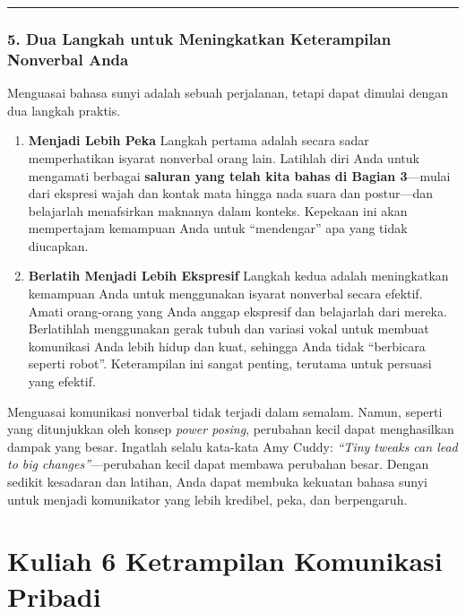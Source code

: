 \documentclass[
  letterpaper,
  DIV=11,
  numbers=noendperiod]{scrreprt}
\begin{document}
\begin{center}\rule{0.5\linewidth}{0.5pt}\end{center}

\subsection{5. Dua Langkah untuk Meningkatkan Keterampilan Nonverbal
Anda}\label{dua-langkah-untuk-meningkatkan-keterampilan-nonverbal-anda-1}

Menguasai bahasa sunyi adalah sebuah perjalanan, tetapi dapat dimulai
dengan dua langkah praktis.

\begin{enumerate}
\def\labelenumi{\arabic{enumi}.}
\item
  \textbf{Menjadi Lebih Peka} Langkah pertama adalah secara sadar
  memperhatikan isyarat nonverbal orang lain. Latihlah diri Anda untuk
  mengamati berbagai \textbf{saluran yang telah kita bahas di Bagian
  3}---mulai dari ekspresi wajah dan kontak mata hingga nada suara dan
  postur---dan belajarlah menafsirkan maknanya dalam konteks. Kepekaan
  ini akan mempertajam kemampuan Anda untuk ``mendengar'' apa yang tidak
  diucapkan.
\item
  \textbf{Berlatih Menjadi Lebih Ekspresif} Langkah kedua adalah
  meningkatkan kemampuan Anda untuk menggunakan isyarat nonverbal secara
  efektif. Amati orang-orang yang Anda anggap ekspresif dan belajarlah
  dari mereka. Berlatihlah menggunakan gerak tubuh dan variasi vokal
  untuk membuat komunikasi Anda lebih hidup dan kuat, sehingga Anda
  tidak ``berbicara seperti robot''. Keterampilan ini sangat penting,
  terutama untuk persuasi yang efektif.
\end{enumerate}

Menguasai komunikasi nonverbal tidak terjadi dalam semalam. Namun,
seperti yang ditunjukkan oleh konsep \emph{power posing}, perubahan
kecil dapat menghasilkan dampak yang besar. Ingatlah selalu kata-kata
Amy Cuddy: \emph{``Tiny tweaks can lead to big changes''}---perubahan
kecil dapat membawa perubahan besar. Dengan sedikit kesadaran dan
latihan, Anda dapat membuka kekuatan bahasa sunyi untuk menjadi
komunikator yang lebih kredibel, peka, dan berpengaruh.


\chapter{Kuliah 6 Ketrampilan Komunikasi
Pribadi}\label{kuliah-6-ketrampilan-komunikasi-pribadi}
\end{document}
